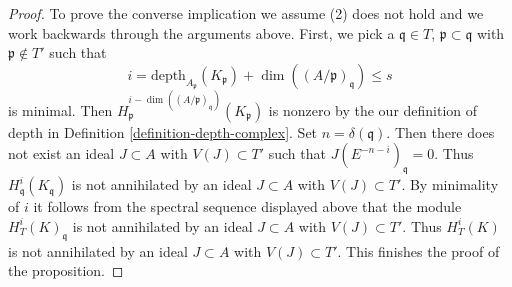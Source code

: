 \documentclass[10pt,a4paper]{amsart}
\theoremstyle{plain}
\theoremstyle{definition}
\theoremstyle{remark}
\numberwithin{equation}{subsection}
\begin{document}
\begin{proof}
\medskip\noindent
To prove the converse implication we assume (2) does not hold
and we work backwards through the arguments above. First, we pick a
$\mathfrak q \in T$, $\mathfrak p \subset \mathfrak q$
with $\mathfrak p \not \in T'$ such that
$$
i = \text{depth}_{A_\mathfrak p}(K_\mathfrak p) +
\dim((A/\mathfrak p)_\mathfrak q) \leq s
$$
is minimal. Then
$H^{i - \dim((A/\mathfrak p)_\mathfrak q)}_\mathfrak p(K_\mathfrak p)$
is nonzero by the our definition of depth in
Definition \ref{definition-depth-complex}.
Set $n = \delta(\mathfrak q)$. Then
there does not exist an ideal $J \subset A$ with $V(J) \subset T'$
such that $J(E^{-n - i})_\mathfrak q = 0$.
Thus $H^i_\mathfrak q(K_\mathfrak q)$ is not
annihilated by an ideal $J \subset A$ with $V(J) \subset T'$.
By minimality of $i$ it follows from the spectral sequence displayed above
that the module $H^i_T(K)_\mathfrak q$
is not annihilated by an ideal $J \subset A$
with $V(J) \subset T'$. Thus $H^i_T(K)$
is not annihilated by an ideal $J \subset A$
with $V(J) \subset T'$. This finishes the proof of the proposition.
\end{proof}
\end{document}
